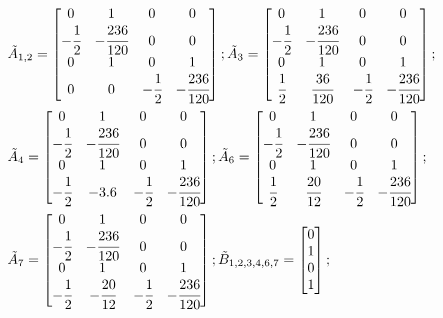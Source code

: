 \begin{align*}
	&\tilde{A}_{1,2} =
	\begin{bmatrix}
		0 & 1 & 0 & 0\\
		- \cfrac{1}{2} & - \cfrac{236}{120} & 0 & 0\\
		0 & 1 & 0 & 1\\
		0 & 0 &- \cfrac{1}{2} & - \cfrac{236}{120}
	\end{bmatrix};
	\tilde{A}_3 =
	\begin{bmatrix}
		0 & 1 & 0 & 0\\
		- \cfrac{1}{2} & - \cfrac{236}{120} & 0 & 0\\
		0 & 1 & 0 & 1\\
		\cfrac{1}{2} & \cfrac{36}{120} &- \cfrac{1}{2} & - \cfrac{236}{120}
	\end{bmatrix};\\
	&\tilde{A}_4 =
	\begin{bmatrix}
		0 & 1 & 0 & 0\\
		- \cfrac{1}{2} & - \cfrac{236}{120} & 0 & 0\\
		0 & 1 & 0 & 1\\
		- \cfrac{1}{2} & - 3.6 &- \cfrac{1}{2} & - \cfrac{236}{120}
	\end{bmatrix};
	\tilde{A}_6 =
	\begin{bmatrix}
		0 & 1 & 0 & 0\\
		- \cfrac{1}{2} & - \cfrac{236}{120} & 0 & 0\\
		0 & 1 & 0 & 1\\
		\cfrac{1}{2} & \cfrac{20}{12} &- \cfrac{1}{2} & - \cfrac{236}{120}
	\end{bmatrix};\\
	&\tilde{A}_7 =
	\begin{bmatrix}
		0 & 1 & 0 & 0\\
		- \cfrac{1}{2} & - \cfrac{236}{120} & 0 & 0\\
		0 & 1 & 0 & 1\\
		- \cfrac{1}{2} & - \cfrac{20}{12} &- \cfrac{1}{2} & - \cfrac{236}{120}
	\end{bmatrix};
	\tilde{B}_{1,2,3,4,6,7} =
	\begin{bmatrix}
		0\\
		1\\
		0\\
		1
	\end{bmatrix};
\end{align*}

